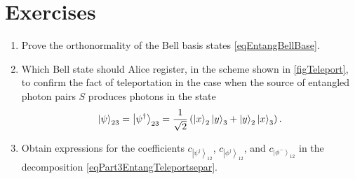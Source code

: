 











\section{Exercises}
\begin{enumerate}
\item Prove the orthonormality of the Bell basis states
  \eqref{eqEntangBellBase}. 
\item Which Bell state should Alice register, in the scheme
  shown in \autoref{figTeleport}, to
  confirm the fact of teleportation in the case when the source
  of entangled photon pairs $S$ produces photons in the state 
\begin{equation}
  \left|\psi\right>_{23} = \left|\psi^{\dag}\right>_{23} = \frac{1}{\sqrt{2}}\left(
  \ket{x}_2\ket{y}_3 +
  \ket{y}_2\ket{x}_3
  \right).
  \nonumber
\end{equation}
\item Obtain expressions for the coefficients 
$c_{\left|\psi^{\dag}\right>_{12}}$, 
$c_{\left|\phi^{\dag}\right>_{12}}$, and 
$c_{\left|\phi^{-}\right>_{12}}$
in the decomposition \eqref{eqPart3EntangTeleportsepar}.
\end{enumerate}